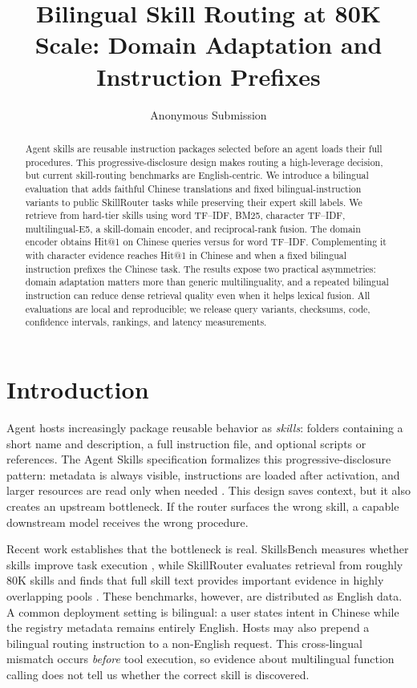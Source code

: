 \documentclass[letterpaper]{article}
\title{Bilingual Skill Routing at 80K Scale: Domain Adaptation and Instruction Prefixes}
\author{Anonymous Submission}
\begin{document}
\maketitle

\begin{abstract}
Agent skills are reusable instruction packages selected before an agent loads
their full procedures.  This progressive-disclosure design makes routing a
high-leverage decision, but current skill-routing benchmarks are
English-centric.
We introduce a bilingual evaluation that adds faithful Chinese translations
and fixed bilingual-instruction variants to \PublicTaskCount{} public
SkillRouter tasks while
preserving their expert skill labels.  We retrieve from \PublicSkillCount{}
hard-tier skills using word TF--IDF, BM25, character TF--IDF,
multilingual-E5, a skill-domain encoder, and reciprocal-rank fusion.  The
domain encoder obtains \SrZhHit{} Hit@1 on Chinese queries versus
\WordZhHit{} for word TF--IDF.  Complementing it with character evidence
reaches \FusionZhHit{} Hit@1 in Chinese and \FusionInstHit{} when a fixed
bilingual instruction prefixes the Chinese task.  The results expose
two practical asymmetries: domain adaptation matters more than generic
multilinguality, and a repeated bilingual instruction can reduce dense
retrieval quality even when it helps lexical fusion.  All evaluations are
local and reproducible; we release query variants, checksums, code, confidence
intervals, rankings, and latency measurements.
\end{abstract}

\section{Introduction}

Agent hosts increasingly package reusable behavior as \emph{skills}: folders
containing a short name and description, a full instruction file, and optional
scripts or references.  The Agent Skills specification formalizes this
progressive-disclosure pattern: metadata is always visible, instructions are
loaded after activation, and larger resources are read only when needed
\cite{agentskills2025spec,zhang2025equipping}.  This design saves context, but
it also creates an upstream bottleneck.  If the router surfaces the wrong
skill, a capable downstream model receives the wrong procedure.

Recent work establishes that the bottleneck is real.  SkillsBench measures
whether skills improve task execution \cite{li2026skillsbench}, while
SkillRouter evaluates retrieval from roughly 80K skills and finds that full
skill text provides important evidence in highly overlapping pools
\cite{zheng2026skillrouter}.  These benchmarks, however, are distributed as
English data.  A common deployment setting is bilingual: a user states intent in Chinese
while the registry metadata remains entirely English.  Hosts may also prepend
a bilingual routing instruction to a non-English request.  This cross-lingual
mismatch occurs \emph{before} tool execution, so evidence about multilingual
function calling \cite{guo2024ctooleval,luo2026lost} does not tell us whether
the correct skill is discovered.
\end{document}
